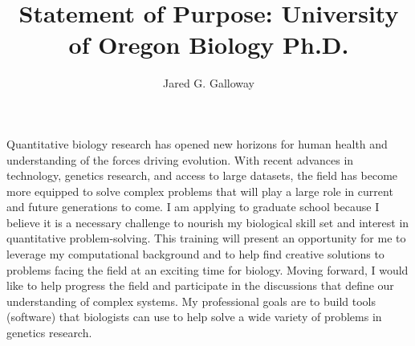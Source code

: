 \documentclass[12pt]{amsart}
\title{Statement of Purpose: University of Oregon Biology Ph.D.}
\author{Jared G. Galloway}
\newcommand{\sepspace}{\vspace*{1em}}		%
\begin{document}
\maketitle

\sepspace

Quantitative biology research has opened new horizons for human health and understanding of the forces driving evolution.
With recent advances in technology, genetics research, and access to large datasets, %
the field has become more equipped to solve complex problems that will play a large role in current and future generations to come.
I am applying to graduate school because I believe it is a necessary challenge to nourish my biological skill set and interest in quantitative problem-solving. 
This training will present an opportunity for me to leverage my computational background and to help find creative solutions to problems facing the field at an exciting time for biology.
Moving forward, I would like to help progress the field and participate in the discussions that define our understanding of complex systems.
My professional goals are to build tools (software) that biologists can use to help solve a wide variety of problems in genetics research.

\end{document}
